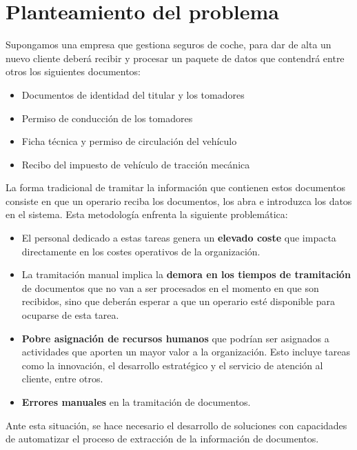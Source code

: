 \section{Planteamiento del problema}\label{sec:plantenamiento_problema}

Supongamos una empresa que gestiona seguros de coche, para dar de alta un nuevo cliente deberá recibir y procesar
un paquete de datos que contendrá entre otros los siguientes documentos:

\begin{itemize}
    \item Documentos de identidad del titular y los tomadores
    \item Permiso de conducción de los tomadores
    \item Ficha técnica y permiso de circulación del vehículo
    \item Recibo del impuesto de vehículo de tracción mecánica
\end{itemize}

La forma tradicional de tramitar la información que contienen estos documentos consiste en que un operario reciba los
documentos, los abra e introduzca los datos en el sistema.
Esta metodología enfrenta la siguiente problemática:

\begin{itemize}
    \item
    El personal dedicado a estas tareas genera un \textbf{elevado coste} que impacta directamente en los costes
    operativos de la organización.

    \item
    La tramitación manual implica la \textbf{demora en los tiempos de tramitación} de documentos que no van a ser
    procesados en el momento en que son recibidos, sino que deberán esperar a que un operario esté disponible para
    ocuparse de esta tarea.

    \item
    \textbf{Pobre asignación de recursos humanos} que podrían ser asignados a actividades que aporten un mayor valor a
    la organización.
    Esto incluye tareas como la innovación, el desarrollo estratégico y el servicio de atención al cliente, entre otros.

    \item
    \textbf{Errores manuales} en la tramitación de documentos.
\end{itemize}

Ante esta situación, se hace necesario el desarrollo de soluciones con capacidades de automatizar el proceso de
extracción de la información de documentos.
